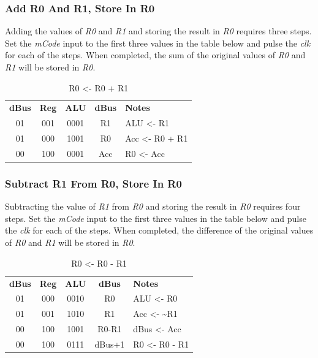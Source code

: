 \subsubsection{Add R0 And R1, Store In R0}

Adding the values of \textit{R0} and \textit{R1} and storing the result in \textit{R0} requires three steps. Set the \textit{mCode} input to the first three values in the table below and pulse the \textit{clk} for each of the steps. When completed, the sum of the original values of \textit{R0} and \textit{R1} will be stored in \textit{R0}.

\begin{table}[H]
	\sffamily
	\newcommand{\head}[1]{\textcolor{white}{\textbf{#1}}}		
	\begin{center}
		\begin{tabular}{ccccl} 
			\textbf{dBus} & \textbf{Reg} & \textbf{ALU} & \textbf{dBus} & \textbf{Notes} \\
			01 & 001 & 0001 & R1 & ALU <- R1 \\
			01 & 000 & 1001 & R0 & Acc <- R0 + R1 \\
			00 & 100 & 0001 & Acc & R0 <- Acc 
		\end{tabular}
	\end{center}
	\caption{R0 <- R0 + R1}
	\label{tab:11-05}
\end{table}

\subsubsection{Subtract R1 From R0, Store In R0}

Subtracting the value of \textit{R1} from \textit{R0} and storing the result in \textit{R0} requires four steps. Set the \textit{mCode} input to the first three values in the table below and pulse the \textit{clk} for each of the steps. When completed, the difference of the original values of \textit{R0} and \textit{R1} will be stored in \textit{R0}.

\begin{table}[H]
	\sffamily
	\newcommand{\head}[1]{\textcolor{white}{\textbf{#1}}}		
	\begin{center}
		\begin{tabular}{ccccl} 
			\textbf{dBus} & \textbf{Reg} & \textbf{ALU} & \textbf{dBus} & \textbf{Notes} \\
			01 & 000 & 0010 & R0 & ALU <- R0 \\
			01 & 001 & 1010 & R1 & Acc <- \textasciitilde R1 \\
			00 & 100 & 1001 & R0-R1 & dBus <- Acc \\
			00 & 100 & 0111 & dBus+1 & R0 <- R0 - R1
		\end{tabular}
	\end{center}
	\caption{R0 <- R0 - R1}
	\label{tab:11-06}
\end{table}

